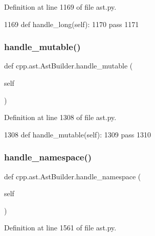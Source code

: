 Definition at line 1169 of file ast.\+py.


\begin{DoxyCode}
1169     \textcolor{keyword}{def }handle\_long(self):
1170         \textcolor{keywordflow}{pass}
1171 
\end{DoxyCode}
\mbox{\label{classcpp_1_1ast_1_1AstBuilder_a6a642353cfe2cddd1a60cbb1011df787}} 
\subsubsection{\texorpdfstring{handle\+\_\+mutable()}{handle\_mutable()}}
{\footnotesize\ttfamily def cpp.\+ast.\+Ast\+Builder.\+handle\+\_\+mutable (\begin{DoxyParamCaption}\item[{}]{self }\end{DoxyParamCaption})}



Definition at line 1308 of file ast.\+py.


\begin{DoxyCode}
1308     \textcolor{keyword}{def }handle\_mutable(self):
1309         \textcolor{keywordflow}{pass}
1310 
\end{DoxyCode}
\mbox{\label{classcpp_1_1ast_1_1AstBuilder_ae6dde01c5f9ac7ba3b14dff01cac66e4}} 
\subsubsection{\texorpdfstring{handle\+\_\+namespace()}{handle\_namespace()}}
{\footnotesize\ttfamily def cpp.\+ast.\+Ast\+Builder.\+handle\+\_\+namespace (\begin{DoxyParamCaption}\item[{}]{self }\end{DoxyParamCaption})}



Definition at line 1561 of file ast.\+py.



